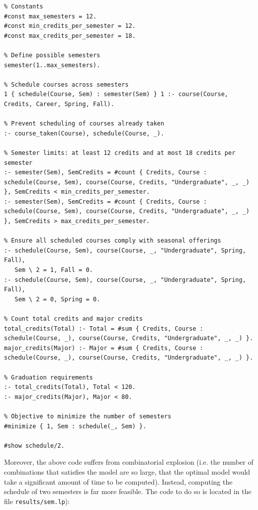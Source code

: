 \documentclass[12pt]{article}
\begin{document}
    \begin{lstlisting}
% Constants
#const max_semesters = 12.
#const min_credits_per_semester = 12.
#const max_credits_per_semester = 18.

% Define possible semesters
semester(1..max_semesters).

% Schedule courses across semesters
1 { schedule(Course, Sem) : semester(Sem) } 1 :- course(Course, Credits, Career, Spring, Fall).

% Prevent scheduling of courses already taken
:- course_taken(Course), schedule(Course, _).

% Semester limits: at least 12 credits and at most 18 credits per semester
:- semester(Sem), SemCredits = #count { Credits, Course : schedule(Course, Sem), course(Course, Credits, "Undergraduate", _, _) }, SemCredits < min_credits_per_semester.
:- semester(Sem), SemCredits = #count { Credits, Course : schedule(Course, Sem), course(Course, Credits, "Undergraduate", _, _) }, SemCredits > max_credits_per_semester.

% Ensure all scheduled courses comply with seasonal offerings
:- schedule(Course, Sem), course(Course, _, "Undergraduate", Spring, Fall), 
   Sem \ 2 = 1, Fall = 0.
:- schedule(Course, Sem), course(Course, _, "Undergraduate", Spring, Fall), 
   Sem \ 2 = 0, Spring = 0.

% Count total credits and major credits
total_credits(Total) :- Total = #sum { Credits, Course : schedule(Course, _), course(Course, Credits, "Undergraduate", _, _) }.
major_credits(Major) :- Major = #sum { Credits, Course : schedule(Course, _), course(Course, Credits, "Undergraduate", _, _) }.

% Graduation requirements
:- total_credits(Total), Total < 120.
:- major_credits(Major), Major < 80.

% Objective to minimize the number of semesters
#minimize { 1, Sem : schedule(_, Sem) }.

#show schedule/2.
    \end{lstlisting}

    Moreover, the above code suffers from combinatorial explosion (i.e. the number of combinations that satisfies the model are so large, that the optimal model would take a significant amount of time to be computed).
    Instead, computing the schedule of two semesters is far more feasible. The code to do so is located in the file {\tt{results/sem.lp}}): \\
\end{document}

